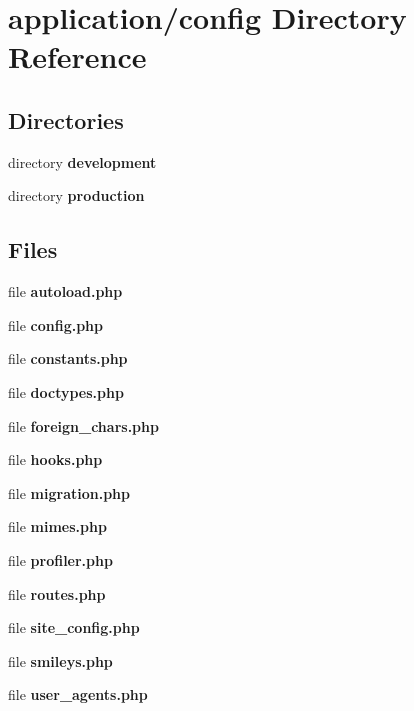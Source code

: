 \section{application/config Directory Reference}
\label{dir_2bf452391e2991b6701cbbf63c20050f}
\subsection*{Directories}
\begin{DoxyCompactItemize}
\item 
directory {\bf development}
\item 
directory {\bf production}
\end{DoxyCompactItemize}
\subsection*{Files}
\begin{DoxyCompactItemize}
\item 
file {\bf autoload.\-php}
\item 
file {\bf config.\-php}
\item 
file {\bf constants.\-php}
\item 
file {\bf doctypes.\-php}
\item 
file {\bf foreign\-\_\-chars.\-php}
\item 
file {\bf hooks.\-php}
\item 
file {\bf migration.\-php}
\item 
file {\bf mimes.\-php}
\item 
file {\bf profiler.\-php}
\item 
file {\bf routes.\-php}
\item 
file {\bf site\-\_\-config.\-php}
\item 
file {\bf smileys.\-php}
\item 
file {\bf user\-\_\-agents.\-php}
\end{DoxyCompactItemize}
